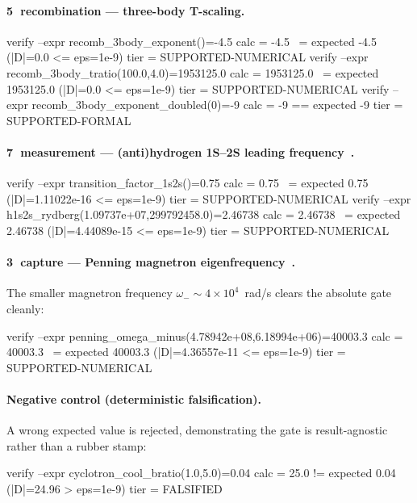 \documentclass[11pt,a4paper]{article}
\newcommand{\stg}[1]{\textcircled{\scriptsize#1}}
\begin{document}
\paragraph{\stg{5} recombination --- three-body T-scaling.}
\begin{verdict}
verify --expr recomb_3body_exponent()=-4.5
  calc   = -4.5  ~= expected -4.5  (|D|=0.0 <= eps=1e-9)
  tier   = SUPPORTED-NUMERICAL
verify --expr recomb_3body_tratio(100.0,4.0)=1953125.0
  calc   = 1953125.0  ~= expected 1953125.0  (|D|=0.0 <= eps=1e-9)
  tier   = SUPPORTED-NUMERICAL
verify --expr recomb_3body_exponent_doubled(0)=-9
  calc   = -9  == expected -9
  tier   = SUPPORTED-FORMAL
\end{verdict}

\paragraph{\stg{7} measurement --- (anti)hydrogen 1S--2S leading frequency~\citep{Ahmadi2018,Tiesinga2021}.}
\begin{verdict}
verify --expr transition_factor_1s2s()=0.75
  calc   = 0.75  ~= expected 0.75  (|D|=1.11022e-16 <= eps=1e-9)
  tier   = SUPPORTED-NUMERICAL
verify --expr h1s2s_rydberg(1.09737e+07,299792458.0)=2.46738
  calc   = 2.46738  ~= expected 2.46738  (|D|=4.44089e-15 <= eps=1e-9)
  tier   = SUPPORTED-NUMERICAL
\end{verdict}

\paragraph{\stg{3} capture --- Penning magnetron eigenfrequency~\citep{Brown1986}.}
The smaller magnetron frequency $\omega_-\sim4\times10^{4}$~rad/s clears the
absolute gate cleanly:
\begin{verdict}
verify --expr penning_omega_minus(4.78942e+08,6.18994e+06)=40003.3
  calc   = 40003.3  ~= expected 40003.3  (|D|=4.36557e-11 <= eps=1e-9)
  tier   = SUPPORTED-NUMERICAL
\end{verdict}

\paragraph{Negative control (deterministic falsification).}
A wrong expected value is rejected, demonstrating the gate is
result-agnostic rather than a rubber stamp:
\begin{verdict}
verify --expr cyclotron_cool_bratio(1.0,5.0)=0.04
  calc   = 25.0  != expected 0.04  (|D|=24.96 > eps=1e-9)
  tier   = FALSIFIED
\end{verdict}
\end{document}
